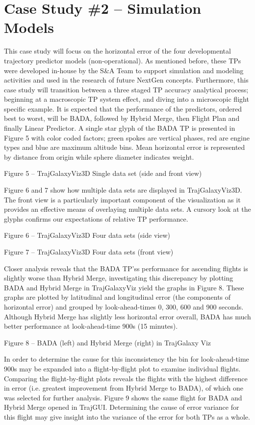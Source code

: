 \documentclass[]{article}
\begin{document}
\section{Case Study \#2 – Simulation Models}
\label{caseStudy2}
This case study will focus on the horizontal error of the four developmental trajectory predictor models (non-operational). As mentioned before, these TPs were developed in-house by the S\&A Team to support simulation and modeling activities and used in the research of future NextGen concepts. Furthermore, this case study will transition between a three staged TP accuracy analytical process; beginning at a macroscopic TP system effect, and diving into a microscopic flight specific example. It is expected that the performance of the predictors, ordered best to worst, will be BADA, followed by Hybrid Merge, then Flight Plan and finally Linear Predictor. A single star glyph of the BADA TP is presented in Figure 5 with color coded factors; green spokes are vertical phases, red are engine types and blue are maximum altitude bins. Mean horizontal error is represented by distance from origin while sphere diameter indicates weight.

 
Figure 5 – TrajGalaxyViz3D Single data set (side and front view)

Figure 6 and 7 show how multiple data sets are displayed in TrajGalaxyViz3D. The front view is a particularly important component of the visualization as it provides an effective means of overlaying multiple data sets. A cursory look at the glyphs confirms our expectations of relative TP performance.


Figure 6 – TrajGalaxyViz3D Four data sets (side view)


Figure 7 – TrajGalaxyViz3D Four data sets (front view)

Closer analysis reveals that the BADA TP’ss performance for ascending flights is slightly worse than Hybrid Merge, investigating this discrepancy by plotting BADA and Hybrid Merge in TrajGalaxyViz yield the graphs in Figure 8. These graphs are plotted by latitudinal and longitudinal error (the components of horizontal error) and grouped by look-ahead-times 0, 300, 600 and 900 seconds. Although Hybrid Merge has slightly less horizontal error overall, BADA has much better performance at look-ahead-time 900s (15 minutes).


Figure 8 – BADA (left) and Hybrid Merge (right) in TrajGalaxy Viz

In order to determine the cause for this inconsistency the bin for look-ahead-time 900s may be expanded into a flight-by-flight plot to examine individual flights. Comparing the flight-by-flight plots reveals the flights with the highest difference in error (i.e. greatest improvement from Hybrid Merge to BADA), of which one was selected for further analysis. Figure 9 shows the same flight for BADA and Hybrid Merge opened in TrajGUI. Determining the cause of error variance for this flight may give insight into the variance of the error for both TPs as a whole.
\end{document}
